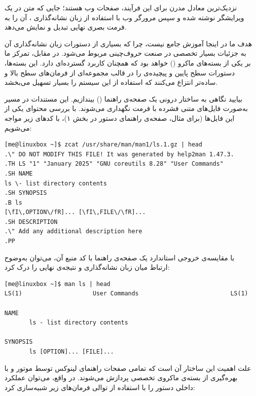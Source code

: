 نزدیک‌ترین معادل مدرن برای این فرآیند، صفحات وب هستند؛ جایی که متن در یک ویرایشگر نوشته شده و سپس مرورگر وب با استفاده از زبان نشانه‌گذاری ، آن را به فرمت بصری نهایی تبدیل و نمایش می‌دهد.

هدف ما در اینجا آموزش جامع  نیست، چرا که بسیاری از دستورات زبان نشانه‌گذاری آن به جزئیات بسیار تخصصی در صنعت حروف‌چینی مربوط می‌شود. در مقابل، تمرکز ما بر یکی از بسته‌های ماکرو () خواهد بود که همچنان کاربرد گسترده‌ای دارد. این بسته‌ها، دستورات سطح پایین و پیچیده‌ی  را در قالب مجموعه‌ای از فرمان‌های سطح بالا و ساده‌تر انتزاع می‌کنند که استفاده از این سیستم را بسیار تسهیل می‌بخشد.

بیایید نگاهی به ساختار درونی یک صفحه‌ی راهنما () بیندازیم. این مستندات در مسیر  به‌صورت فایل‌های متنی فشرده با فرمت  نگهداری می‌شوند. با بررسی محتوای یکی از این فایل‌ها (برای مثال، صفحه‌ی راهنمای دستور  در بخش ۱)، با کدهای زیر مواجه می‌شویم:

\begin{latin}
\begin{lstlisting}
[me@linuxbox ~]$ zcat /usr/share/man/man1/ls.1.gz | head
.\" DO NOT MODIFY THIS FILE! It was generated by help2man 1.47.3.
.TH LS "1" "January 2025" "GNU coreutils 8.28" "User Commands"
.SH NAME
ls \- list directory contents
.SH SYNOPSIS
.B ls
[\fI\,OPTION\/fR]... [\fI\,FILE\/\fR]...
.SH DESCRIPTION
.\" Add any additional description here
.PP
\end{lstlisting}
\end{latin}

با مقایسه‌ی خروجی استاندارد یک صفحه‌ی راهنما با کد منبع آن، می‌توان به‌وضوح ارتباط میان زبان نشانه‌گذاری و نتیجه‌ی نهایی را درک کرد:

\begin{latin}
\begin{lstlisting}
[me@linuxbox ~]$ man ls | head
LS(1)                    User Commands                          LS(1)

NAME
       ls - list directory contents

SYNOPSIS
       ls [OPTION]... [FILE]...
\end{lstlisting}
\end{latin}

علت اهمیت این ساختار آن است که تمامی صفحات راهنمای لینوکس توسط موتور  و با بهره‌گیری از بسته‌ی ماکروی تخصصی  پردازش می‌شوند. در واقع، می‌توان عملکرد داخلی دستور  را با استفاده از توالی فرمان‌های زیر شبیه‌سازی کرد:


